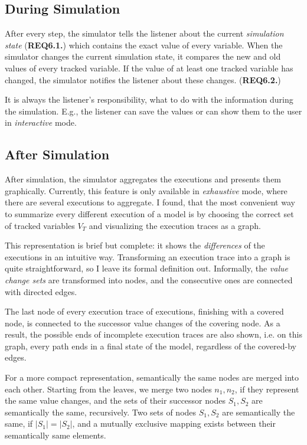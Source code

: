 \subsection{During Simulation}
After every step, the simulator tells the listener about the current \textit{simulation state} (\textbf{REQ6.1.}) which contains the exact value of every variable. When the simulator changes the current simulation state, it compares the new and old values of every tracked variable. If the value of at least one tracked variable has changed, the simulator notifies the listener about these changes. (\textbf{REQ6.2.})

It is always the listener's responsibility, what to do with the information during the simulation. E.g., the listener can save the values or can show them to the user in \textit{interactive} mode.

\subsection{After Simulation}\label{ssec:observ-aftersim}
After simulation, the simulator aggregates the executions and presents them graphically. Currently, this feature is only available in \textit{exhaustive} mode, where there are several executions to aggregate. I found, that the most convenient way to summarize every different execution of a model is by choosing the correct set of tracked variables $V_T$ and visualizing the execution traces as a graph.

This representation is brief but complete: it shows the \emph{differences} of the executions in an intuitive way. Transforming an execution trace into a graph is quite straightforward, so I leave its formal definition out. Informally, the \emph{value change sets} are transformed into nodes, and the consecutive ones are connected with directed edges.

The last node of every execution trace of executions, finishing with a covered node, is connected to the successor value changes of the covering node. As a result, the possible ends of incomplete execution traces are also shown, i.e. on this graph, every path ends in a final state of the model, regardless of the covered-by edges.

For a more compact representation, semantically the same nodes are merged into each other. Starting from the leaves, we merge two nodes $n_1, n_2$, if they represent the same value changes, and the sets of their successor nodes $S_1, S_2$ are semantically the same, recursively. Two sets of nodes $S_1, S_2$ are semantically the same, if $|S_1| = |S_2|$, and a mutually exclusive mapping exists between their semantically same elements.

